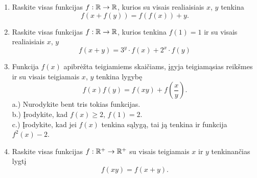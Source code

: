 \begin{enumerate}
  \item Raskite visas funkcijas $f:\mathbb R\to\mathbb R$, kurios su visais realiaisiais
    $x$, $y$ tenkina $$f(x+f(y))=f(f(x))+y.$$
  \item Raskite visas funkcijas $f:\mathbb R\to\mathbb R$, kurios tenkina $f(1)=1$ ir su
    visais realiaisiais $x$, $y$ $$f(x+y)=3^y\cdot f(x)+2^x\cdot f(y)$$
  \item \text{[LitMo 2008]} Funkcija $f(x)$ apibrėžta teigiamiems
    skaičiams, įgyja teigiamąsias reikšmes ir su visais teigiamais $x$,
    $y$ tenkina lygybę $$f(x)f(y) = f(xy) + f(\frac{x}{y}).$$
    a.) Nurodykite bent tris tokias funkcijas.  \\[0.5cm]
    b.) Įrodykite, kad $f(x)\geq 2$, $f(1)=2$.  \\[0.5cm]
    c.) Įrodykite, kad jei $f(x)$ tenkina sąlygą, tai ją tenkina ir
    funkcija $f^2(x)-2$.
  \item Raskite visas funkcijas $f:\mathbb R ^{+}\to \mathbb R ^{+}$ su visais teigiamais
    $x$ ir $y$ tenkinančias lygtį $$f(xy)=f(x+y).$$

\end{enumerate}
